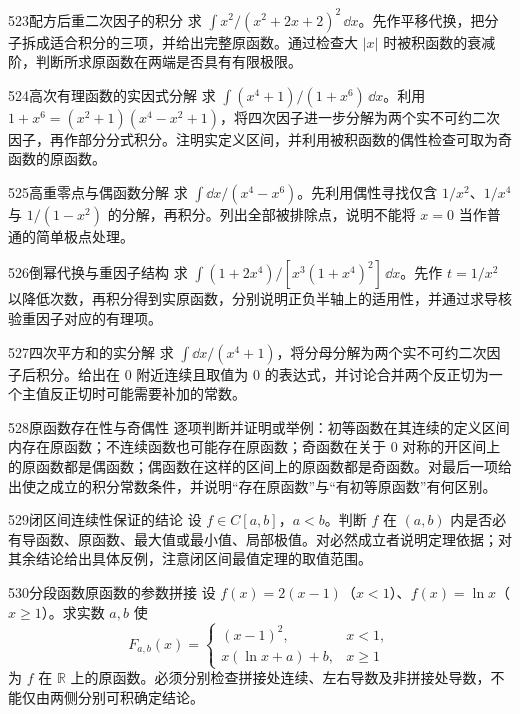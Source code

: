 \begin{exercise}{523}{配方后重二次因子的积分}
求 $\int x^2/(x^2+2x+2)^2\,\dd x$。先作平移代换，把分子拆成适合积分的三项，并给出完整原函数。通过检查大 $|x|$ 时被积函数的衰减阶，判断所求原函数在两端是否具有有限极限。
\end{exercise}
\begin{exercise}{524}{高次有理函数的实因式分解}
求 $\int(x^4+1)/(1+x^6)\,\dd x$。利用 $1+x^6=(x^2+1)(x^4-x^2+1)$，将四次因子进一步分解为两个实不可约二次因子，再作部分分式积分。注明实定义区间，并利用被积函数的偶性检查可取为奇函数的原函数。
\end{exercise}
\begin{exercise}{525}{高重零点与偶函数分解}
求 $\int\dd x/(x^4-x^6)$。先利用偶性寻找仅含 $1/x^2$、$1/x^4$ 与 $1/(1-x^2)$ 的分解，再积分。列出全部被排除点，说明不能将 $x=0$ 当作普通的简单极点处理。
\end{exercise}
\begin{exercise}{526}{倒幂代换与重因子结构}
求 $\int(1+2x^4)/[x^3(1+x^4)^2]\,\dd x$。先作 $t=1/x^2$ 以降低次数，再积分得到实原函数，分别说明正负半轴上的适用性，并通过求导核验重因子对应的有理项。
\end{exercise}
\begin{exercise}{527}{四次平方和的实分解}
求 $\int\dd x/(x^4+1)$，将分母分解为两个实不可约二次因子后积分。给出在 $0$ 附近连续且取值为 $0$ 的表达式，并讨论合并两个反正切为一个主值反正切时可能需要补加的常数。
\end{exercise}
\begin{exercise}{528}{原函数存在性与奇偶性}
逐项判断并证明或举例：初等函数在其连续的定义区间内存在原函数；不连续函数也可能存在原函数；奇函数在关于 $0$ 对称的开区间上的原函数都是偶函数；偶函数在这样的区间上的原函数都是奇函数。对最后一项给出使之成立的积分常数条件，并说明“存在原函数”与“有初等原函数”有何区别。
\end{exercise}
\begin{exercise}{529}{闭区间连续性保证的结论}
设 $f\in C[a,b]$，$a<b$。判断 $f$ 在 $(a,b)$ 内是否必有导函数、原函数、最大值或最小值、局部极值。对必然成立者说明定理依据；对其余结论给出具体反例，注意闭区间最值定理的取值范围。
\end{exercise}
\begin{exercise}{530}{分段函数原函数的参数拼接}
设 $f(x)=2(x-1)$（$x<1$）、$f(x)=\ln x$（$x\ge1$）。求实数 $a,b$ 使
\[F_{a,b}(x)=\begin{cases}(x-1)^2,&x<1,\\x(\ln x+a)+b,&x\ge1\end{cases}\]
为 $f$ 在 $\mathbb R$ 上的原函数。必须分别检查拼接处连续、左右导数及非拼接处导数，不能仅由两侧分别可积确定结论。
\end{exercise}
